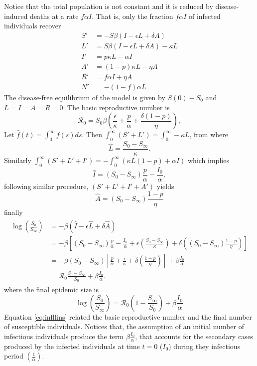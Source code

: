 \documentclass{book}\usepackage[]{graphicx}\usepackage[]{color}
\begin{document}
Notice that the total population is not constant and it is reduced by disease-induced deaths at a rate $f\alpha I$. That is, only the fraction $f\alpha I$ of infected individuals recover
\begin{equation}
\begin{split}
S' &= -S\beta(I-\epsilon L+\delta A)\\
L' &= S\beta(I-\epsilon L+\delta A)-\kappa L\\
I' &= p\kappa L-\alpha I\\
A' &= (1-p)\kappa L-\eta A\\
R' &= f\alpha I+\eta A\\
N' &= -(1-f)\alpha L
\end{split}
\end{equation}
%
The disease-free equilibrium of the model is given by $S(0)-S_0$ and $L=I=A=R=0$.
%
The basic reproductive number is 
$$
\mathcal{R}_0=S_0\beta\left(\frac{\epsilon}{\kappa}+\frac{p}{\alpha}+\frac{\delta(1-p)}{\eta} \right),
$$
%
Let $\hat{f}(t)=\int_0^\infty f(s) ds$. Then $\int_{0}^\infty (S'+L')=\int_{0}^\infty-\kappa L$, from where 
$$
\hat{L}=\frac{S_0-S_\infty}{\kappa}.
$$ 
Similarly $\int_{0}^\infty (S'+L'+I')= -\int_{0}^\infty (\kappa L(1-p)+\alpha I)$ which implies 
$$
\hat{I}=(S_0-S_\infty)\frac{p}{\alpha}-\frac{I_0}{\alpha},
$$
following similar procedure, $(S'+L'+I'+A')$ yields
$$
\hat{A}=(S_0-S_\infty)\frac{1-p}{\eta}
$$
finally
%
\begin{align*}
\begin{split}
\log\left(\frac{S_0}{S_\infty}\right) &=-\beta \left( \hat{I}-\epsilon \hat{L}+\delta \hat{A} \right)\\
&= -\beta\left[ (S_0-S_\infty)\frac{p}{\alpha}-\frac{I_0}{\alpha} +\epsilon \left( \frac{S_0-S_\infty}{\kappa} \right) +\delta\left( (S_0-S_\infty)\frac{1-p}{\eta} \right) \right]\\
&= -\beta(S_0-S_\infty)\left[  \frac{p}{\alpha} +  \frac{\epsilon}{\kappa} +\delta\left( \frac{1-p}{\eta} \right)  \right]+\beta\frac{I_0}{\alpha}\\
&= \mathcal{R}_0\frac{S_0-S_\infty}{S_0}+\beta\frac{I_0}{\alpha}.
\end{split}
\end{align*}
%
where the final epidemic size is
\begin{equation} \label{eq:inflfins}
    \log\left(\frac{S_0}{S_\infty}\right) = \mathcal{R}_0\left(1-\frac{S_\infty}{S_0}\right)+\beta\frac{I_0}{\alpha}
\end{equation}
%
Equation \eqref{eq:inflfins} related the basic reproductive number and the final number of susceptible individuals. Notices that, the assumption of an initial number of infectious individuals produce the term $\beta\frac{I_0}{\alpha}$, that accounts for the secondary cases produced by the infected individuals at time $t=0$ ($I_0$) during they infectious period $\left(\frac{1}{\alpha}\right)$.
\end{document}
